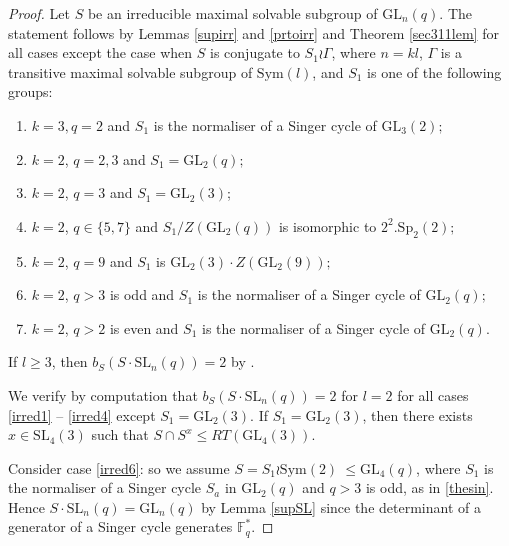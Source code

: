 \documentclass[a4paper,reqno,11pt]{amsart}
\theoremstyle{definition}
\theoremstyle{remark}
\numberwithin{equation}{section}
\newcommand{\Sym}{\mathrm{Sym}}
\newcommand{\SL}{{\mathrm{SL}}}
\newcommand{\GL}{{\mathrm{GL}}}
\newcommand{\Sp}{{\mathrm{Sp}}}
\begin{document}
\begin{proof}
Let $S$ be an  irreducible maximal solvable subgroup of $\GL_n(q).$ The statement  follows by Lemmas \ref{supirr} and \ref{prtoirr} and Theorem \ref{sec311lem}
 for all cases except the case when $S$ is  conjugate to $S_1 \wr \Gamma$, where 
$n=kl$, $\Gamma$ is a transitive maximal  solvable subgroup of $\Sym(l)$, and $S_1$ is  one of the following groups:
\begin{enumerate}[label=\alph*)]
\item $k=3, q=2$ and $S_1$ is the normaliser of a Singer cycle of $\GL_3(2);$ \label{irred1}
\item $k=2$, $q=2,3$ and $S_1=\GL_2(q);$ 
\item $k=2$, $q=3$ and $S_1=\GL_2(3)$; 
\item $k=2$, $q \in \{5,7\}$ and $S_1/Z(\GL_2(q))$ is isomorphic to $2^2.\Sp_2(2);$
\item $k=2$, $q=9$ and $S_1$ is $\GL_2(3) \cdot Z(\GL_2(9));$ \label{irred4}
\item $k=2$, $q>3$ is odd and $S_1$ is the normaliser of a Singer cycle of $\GL_2(q);$ \label{irred6}
\item $k=2$, $q>2$ is even and $S_1$ is the normaliser of a Singer cycle of $\GL_2(q).$ \label{irred5}

\end{enumerate}
If $l \ge 3$, then $b_S(S \cdot \SL_n(q))=2$ by \cite[Theorem 3.1]{james}. %

We verify by computation that $b_S(S \cdot \SL_n(q))=2$ for $l=2$ for all cases \ref{irred1} -- \ref{irred4} except  $S_1=\GL_2(3)$. If $S_1=\GL_2(3)$, then there exists $x \in \SL_4(3)$ such that $S \cap S^x \le RT(\GL_4(3))$. 

Consider  case \ref{irred6}: so we assume $S=S_1 \wr \Sym(2)\ \le \GL_4(q)$, where $S_1$ is the normaliser of a Singer cycle $S_a$ in $\GL_2(q)$ and $q>3$ is odd, as in \eqref{thesin}. Hence $S \cdot \SL_n(q)=\GL_n(q)$ by Lemma \ref{supSL} since the determinant of a generator of a Singer cycle generates $\mathbb{F}_q^*$. 


\end{proof}
\end{document}
